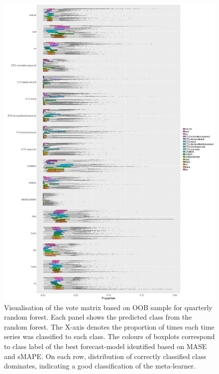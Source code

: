 \documentclass[11pt,a4paper,]{article}
\begin{document}
\begin{figure}
\centering
\includegraphics{figures/oobmonthly-1.png}
\caption{\label{fig:oobmonthly}Visualisation of the vote matrix based on OOB sample for quarterly random forest. Each panel shows the predicted class from the random forest. The X-axis denotes the proportion of times each time series was classified to each class. The colours of boxplots correspond to class label of the best forecast-model identified based on MASE and sMAPE. On each row, distribution of correctly classified class dominates, indicating a good classification of the meta-learner.}
\end{figure}
\end{document}
